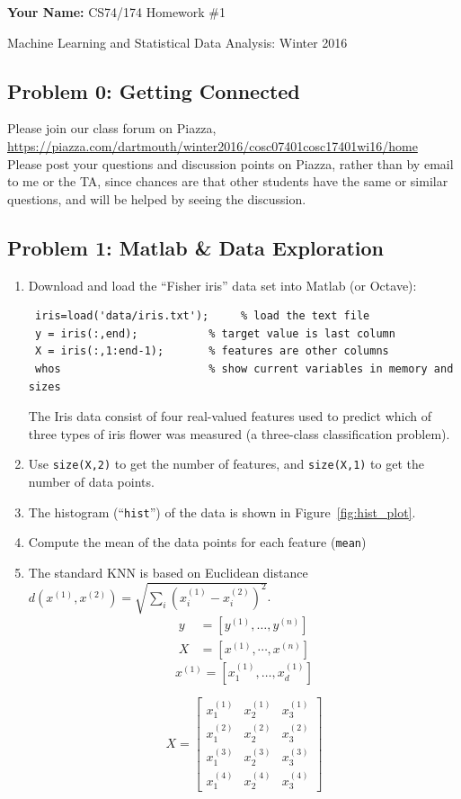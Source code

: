 \documentclass[twoside,11pt]{article}
\theoremstyle{definition}
\begin{document}
\centerline{\Large {\bf Your Name: } CS74/174 Homework \#1}
\centerline{Machine Learning and Statistical Data Analysis: Winter 2016}
\vspace{1cm}

\subsection*{Problem 0: Getting Connected}
Please join our class forum on Piazza, \\
\url{https://piazza.com/dartmouth/winter2016/cosc07401cosc17401wi16/home}\\
Please post your questions and discussion points on Piazza, rather than by email
to me or the TA, since chances are that other students have the same or similar questions,
and will be helped by seeing the discussion.  


\subsection*{Problem 1: Matlab \& Data Exploration}
\begin{enumerate}
\item Download and load the ``Fisher iris'' data set into Matlab (or Octave):
\begin{lstlisting}
 iris=load('data/iris.txt');     % load the text file
 y = iris(:,end);           % target value is last column
 X = iris(:,1:end-1);       % features are other columns
 whos                       % show current variables in memory and sizes
\end{lstlisting}
The Iris data consist of four real-valued features used to predict which of three types of iris
flower was measured (a three-class classification problem).
\item Use \texttt{size(X,2)} to get the number of features, and \texttt{size(X,1)} to get 
the number of data points.
\item The histogram (``\texttt{hist}'') of the data is shown in Figure~\ref{fig:hist_plot}.  
\item Compute the mean of the data points for each feature (\texttt{mean})
\item  The standard KNN is based on Euclidean distance $d(x^{(1)},x^{(2)}) = \sqrt{\sum_i (x_i^{(1)}-x_i^{(2)})^2}$. 
\begin{align}
y & = [y^{(1)}, \ldots, y^{(n)}]\\
X & = [x^{(1)}, \cdots, x^{(n)}] 
\end{align}
$$
x^{(1)} = [x^{(1)}_1, \ldots, x^{(1)}_d]
$$

$$
X = \begin{bmatrix}
x^{(1)}_1& x^{(1)}_2  & x^{(1)}_3 \\
x^{(2)}_1& x^{(2)}_2 & x^{(2)}_3 \\
x^{(3)}_1& x^{(3)}_2 & x^{(3)}_3 \\
x^{(4)}_1& x^{(4)}_2 & x^{(4)}_3 
\end{bmatrix}
$$
\end{enumerate}
\end{document}
